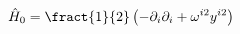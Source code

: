 \begin{equation}
\hat{H}_0 = \fract{1}{2}\left(-\partial_i\partial_i + \omega^{i2}y^{i2} \right)
\label{2.15}
\end{equation}

